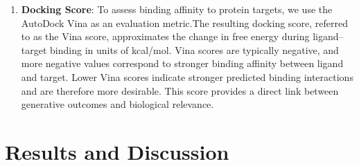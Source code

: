 \documentclass[lettersize,journal]{IEEEtran}
\begin{document}
\begin{enumerate}
    \item \textbf{Docking Score}: To assess binding affinity to protein targets, we use the AutoDock Vina\cite{trott2010autodock} as an evaluation metric.The resulting docking score, referred to as the Vina score, approximates the change in free energy during ligand–target binding in units of kcal/mol. Vina scores are typically negative, and more negative values correspond to stronger binding affinity between ligand and target. Lower Vina scores indicate stronger predicted binding interactions and are therefore more desirable. This score provides a direct link between generative outcomes and biological relevance.  
\end{enumerate}


\section{Results and Discussion}
\end{document}
